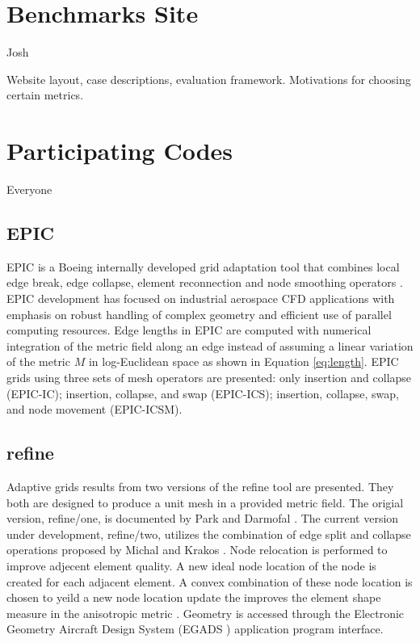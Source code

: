 \documentclass[3p,times,procedia,number]{elsarticle}
\begin{document}
\section{Benchmarks Site}
{\color{red} Josh}

Website layout, case descriptions, evaluation framework.
Motivations for choosing certain metrics.

\section{Participating Codes}
{\color{red} Everyone}

\subsection{EPIC}

EPIC is a Boeing internally developed grid adaptation tool that combines 
local edge break, edge collapse, element reconnection and node smoothing 
operators \cite{michal-krakos-aniso-adapt-edge}.
EPIC development has focused on industrial aerospace CFD 
applications with emphasis on robust handling of complex geometry and 
efficient use of parallel computing resources. Edge lengths in EPIC are 
computed with numerical integration of the metric field along an edge 
instead of assuming a linear variation of the metric $M$ in log-Euclidean space 
as shown in Equation \ref{eq:length}.
EPIC grids using three sets of mesh operators are presented: 
only insertion and collapse (EPIC-IC); insertion, collapse, and swap (EPIC-ICS); 
insertion, collapse, swap, and node movement (EPIC-ICSM).  

\subsection{refine}

Adaptive grids results from two versions of the refine tool are presented.
They both are designed to produce a
unit mesh \cite{loseille-alauzet-siamjna-2011-cont-mesh-framework-1}
in a provided metric field.
The origial version, refine/one, is documented
by Park and Darmofal \cite{park-darmofal-parallel-aniso-adapt-aiaa}.
The current version under development, refine/two,
utilizes the combination of edge split and collapse operations
proposed by Michal and Krakos \cite{michal-krakos-aniso-adapt-edge}.
Node relocation is performed to improve adjecent element quality.
A new ideal node location of the node is created
for each adjacent element.
A convex combination of these node location is chosen
to yeild a new node location update the improves
the element shape measure in the anisotropic
metric \cite{alauzet-topology-moving-mesh}.
Geometry is accessed through the
Electronic Geometry Aircraft Design System
(EGADS \cite{haimes-drela-egads})
application program interface.
\end{document}
